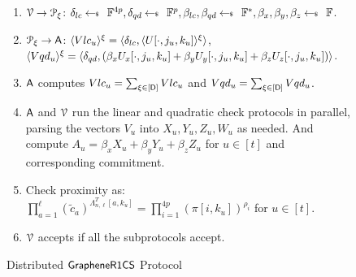 \begin{figure*}[h]
{\begin{framed}
\begin{enumerate}[{\rm 1.}]
				\item $\verifier \rightarrow \distprover$: $\delta_{lc}\sample \FF^{4p}, \delta_{qd}\sample \FF^p, \beta_{lc}, \beta_{qd} \sample \FF^\ast, \beta_x, \beta_y, \beta_z \sample \FF$.
				\item $\distprover \rightarrow \Ag$: $\shr{Vlc_u} = \innp{\delta_{lc}}{\shr{U[\cdot,j_u,k_u]}}$,\\ $\shr{Vqd_u} = \innp{\delta_{qd}}{(\beta_x U_x[\cdot,j_u,k_u] + \beta_y U_y[\cdot,j_u,k_u]  + \beta_z U_z[\cdot,j_u,k_u])}$.
				\item $\Ag$ computes $Vlc_{u} = \sum_{\xi\in [\Num]} Vlc_u$ and $Vqd_{u} = \sum_{\xi\in [\Num]} Vqd_u$.
				\item $\Ag$ and $\verifier$ run the linear and quadratic check protocols in parallel, parsing the vectors $V_u$ into $X_u,Y_u,Z_u,W_u$ as needed. And compute $A_u = \beta_xX_u+\beta_yY_u+\beta_zZ_u$ for $u\in[t]$ and corresponding commitment.
				\item Check proximity as: $\prod_{a=1}^\ell (\tilde{c}_a)^{\Lambda_{n,\ell}^T[a,k_u]}=\prod_{i=1}^{4p}(\pi[i,k_u])^{\rho_i}$ for $u\in [t]$.
				\item $\verifier$ accepts if all the subprotocols accept.
			\end{enumerate}
		\end{framed}
	}
	\caption{Distributed $\grapheneRCS$ Protocol}
	\label{fig:dpgraphene}
\end{figure*}
